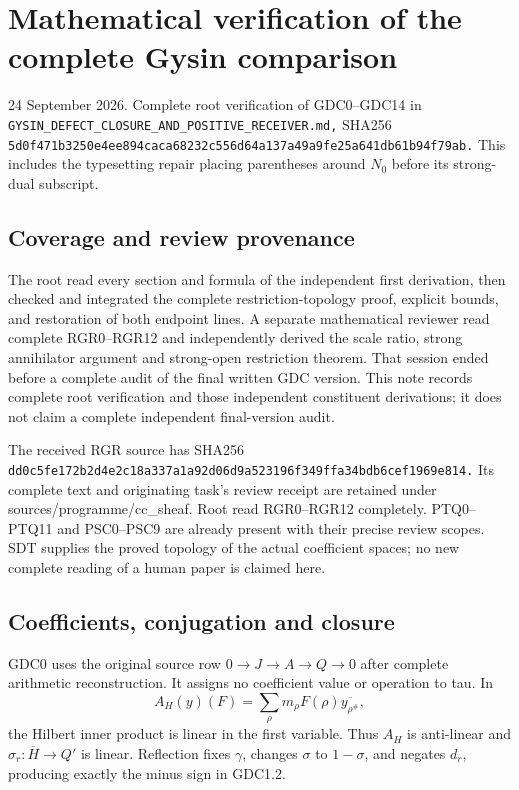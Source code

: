 \section{Mathematical verification of the complete Gysin
comparison}\label{mathematical-verification-of-the-complete-gysin-comparison}

24 September 2026. Complete root verification of GDC0--GDC14 in
\nolinkurl{GYSIN_DEFECT_CLOSURE_AND_POSITIVE_RECEIVER.md,} SHA256
\nolinkurl{5d0f471b3250e4ee894caca68232c556d64a137a49a9fe25a641db61b94f79ab.}
This includes the typesetting repair placing parentheses around \(N_0\)
before its strong-dual subscript.

\subsection{Coverage and review
provenance}\label{coverage-and-review-provenance}

The root read every section and formula of the independent first
derivation, then checked and integrated the complete
restriction-topology proof, explicit bounds, and restoration of both
endpoint lines. A separate mathematical reviewer read complete
RGR0--RGR12 and independently derived the scale ratio, strong
annihilator argument and strong-open restriction theorem. That session
ended before a complete audit of the final written GDC version. This
note records complete root verification and those independent
constituent derivations; it does not claim a complete independent
final-version audit.

The received RGR source has SHA256
\nolinkurl{dd0c5fe172b2d4e2c18a337a1a92d06d9a523196f349ffa34bdb6cef1969e814.}
Its complete text and originating task's review receipt are retained
under sources/programme/cc\_sheaf. Root read RGR0--RGR12 completely.
PTQ0--PTQ11 and PSC0--PSC9 are already present with their precise review
scopes. SDT supplies the proved topology of the actual coefficient
spaces; no new complete reading of a human paper is claimed here.

\subsection{Coefficients, conjugation and
closure}\label{coefficients-conjugation-and-closure}

GDC0 uses the original source row \(0\to J\to A\to Q\to0\) after
complete arithmetic reconstruction. It assigns no coefficient value or
operation to tau. In \[
A_H(y)(F)=\sum_\rho m_\rho F(\rho)\overline{y_{\rho^\#}},
\] the Hilbert inner product is linear in the first variable. Thus
\(A_H\) is anti-linear and \(\sigma_r:\overline H\to Q'\) is linear.
Reflection fixes \(\gamma\), changes \(\sigma\) to \(1-\sigma\), and
negates \(d_r\), producing exactly the minus sign in GDC1.2.

